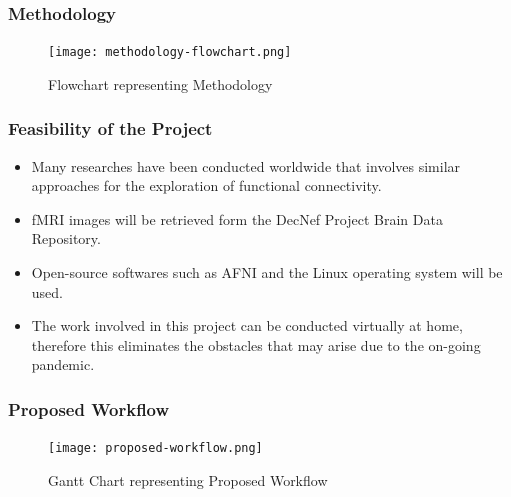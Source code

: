 \documentclass{beamer}
\begin{document}
  \begin{frame}[t]
    \frametitle{Methodology}

    \begin{figure}[H]
      \centering
      \texttt{[image: methodology-flowchart.png]}
      \caption{Flowchart representing Methodology}
    \end{figure}

  \end{frame}


  \begin{frame}[t]
    \frametitle{Feasibility of the Project}

    \begin{itemize}

      \vskip 25pt

      \item  Many researches have been conducted worldwide that
        involves similar approaches for the exploration of functional
        connectivity. \vskip 10pt

      \item fMRI images will be retrieved form the DecNef Project
        Brain Data Repository. \vskip 10pt

      \item Open-source softwares such as AFNI and the Linux operating
        system will be used. \vskip 10pt

      \item The work involved in this project can be conducted
        virtually at home, therefore this eliminates the obstacles
        that may arise due to the on-going pandemic.

    \end{itemize}

  \end{frame}

  \begin{frame}[t]
    \frametitle{Proposed Workflow}

    \vskip 10pt
    \begin{figure}[H]
      \centering
      \texttt{[image: proposed-workflow.png]}
      \caption{Gantt Chart representing Proposed Workflow}
    \end{figure}

  \end{frame}
\end{document}
